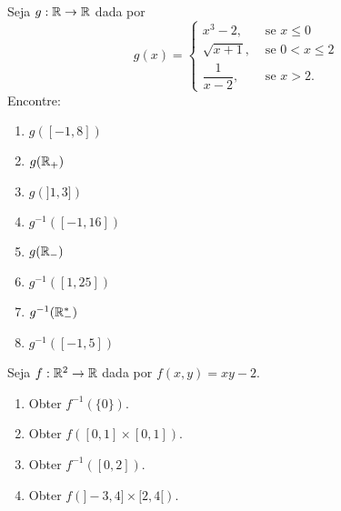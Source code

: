 \documentclass[12pt]{exam}
\begin{document}
    \questao{} Seja $g : \mathbb{R} \to \mathbb{R}$ dada por
    \[
        g(x) = \begin{cases}
            x^3 - 2,& \mbox{ se } x \le 0\\
            \sqrt{x + 1}, & \mbox{ se } 0 < x \le 2\\
            \dfrac{1}{x - 2}, & \mbox{ se } x > 2.
        \end{cases}
    \]
    Encontre:
    \begin{multicols}{2}
        \begin{enumerate}[label={\alph*})]
            \item $g([-1,8])$

            \item $g(\mathbb{R}_+)$

            \item $g(]1, 3])$

            \item $g^{-1}([-1,16])$

            \item $g(\mathbb{R}_-)$

            \item $g^{-1}([1,25])$

            \item $g^{-1}(\mathbb{R}^*_-)$

            \item $g^{-1}([-1,5])$
        \end{enumerate}
    \end{multicols}

    \vspace{.3cm}

    \questao{} Seja $f: \mathbb{R}^2 \to \mathbb{R}$ dada por $f(x,y) = xy - 2$.
    \begin{multicols}{2}
        \begin{enumerate}[label={\alph*})]
            \item Obter $f^{-1}(\{0\})$.

            \item Obter $f([0,1]\times [0,1])$.

            \item Obter $f^{-1}([0,2])$.

            \item Obter $f(]-3,4]\times [2,4[)$.
        \end{enumerate}
    \end{multicols}

    \vspace{.3cm}
\end{document}
